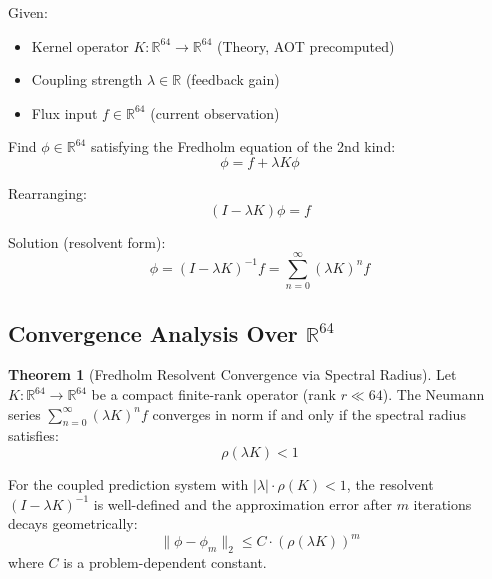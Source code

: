\documentclass[11pt,oneside]{article}
\theoremstyle{definition}
\newtheorem{theorem}{Theorem}
\begin{document}
Given:
\begin{itemize}
  \item Kernel operator $K: \mathbb{R}^{64} \to \mathbb{R}^{64}$ (Theory, AOT precomputed)
  \item Coupling strength $\lambda \in \mathbb{R}$ (feedback gain)
  \item Flux input $f \in \mathbb{R}^{64}$ (current observation)
\end{itemize}

Find $\phi \in \mathbb{R}^{64}$ satisfying the Fredholm equation of the 2nd kind:
\[
\phi = f + \lambda K\phi
\]

Rearranging:
\[
(I - \lambda K) \phi = f
\]

Solution (resolvent form):
\[
\phi = (I - \lambda K)^{-1} f = \sum_{n=0}^{\infty} (\lambda K)^n f
\]

\subsection{Convergence Analysis Over $\mathbb{R}^{64}$}

\begin{theorem}[Fredholm Resolvent Convergence via Spectral Radius]
Let $K: \mathbb{R}^{64} \to \mathbb{R}^{64}$ be a compact finite-rank operator (rank $r \ll 64$). The Neumann series $\sum_{n=0}^{\infty} (\lambda K)^n f$ converges in norm if and only if the spectral radius satisfies:
\[
\rho(\lambda K) < 1
\]

For the coupled prediction system with $|\lambda| \cdot \rho(K) < 1$, the resolvent $(I - \lambda K)^{-1}$ is well-defined and the approximation error after $m$ iterations decays geometrically:
\[
\|\phi - \phi_m\|_2 \leq C \cdot (\rho(\lambda K))^m
\]
where $C$ is a problem-dependent constant.

\end{theorem}
\end{document}
